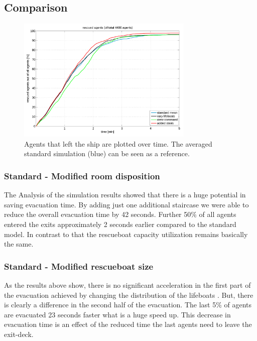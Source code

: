 \documentclass[11pt]{article}
\begin{document}
\subsection{Comparison}


\begin{figure}[H]
\centering
\includegraphics [width=0.75\textwidth]{pics/left_over_time.pdf}
\caption{Agents that left the ship are plotted over time. The averaged standard simulation (blue) can be seen as a reference.}
\label{f:left_over_time}
\end{figure}

\subsubsection{Standard - Modified room disposition}
The Analysis of the simulation results showed that there is a huge potential in saving evacuation time. By adding just one additional staircase we were able to reduce the overall evacuation time by 42 seconds. Further 50\% of all agents entered the exits approximately 2 seconds earlier compared to the standard model. In contrast to that the rescueboat capacity utilization remains basically the same.
\subsubsection{Standard - Modified rescueboat size}

As the results above show, there is no significant acceleration in the first part of the evacuation achieved by changing the distribution of the lifeboats .  
But, there is clearly a difference in the second half of the evacuation. The last 5\% of agents are evacuated 23 seconds faster what is a huge speed up.
This decrease in evacuation time is an effect of the reduced time the last agents need to leave the exit-deck.
\end{document}
